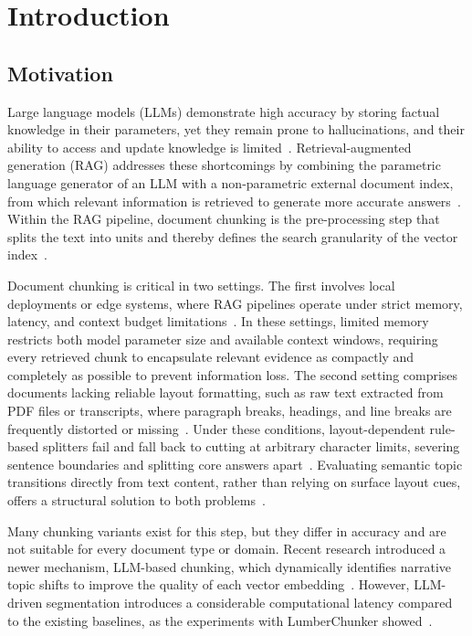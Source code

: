\chapter{Introduction}
\label{ch:intro}

\section{Motivation}

Large language models (LLMs) demonstrate high accuracy by storing factual knowledge in
their parameters, yet they remain prone to hallucinations, and their ability to access and
update knowledge is limited~\cite{lewis2020rag}. Retrieval-augmented generation (RAG)
addresses these shortcomings by combining the parametric language generator of an LLM with
a non-parametric external document index, from which relevant information is retrieved to
generate more accurate answers~\cite{lewis2020rag}. Within the RAG pipeline, document
chunking is the pre-processing step that splits the text into units and thereby defines the
search granularity of the vector index~\cite{smigielski2026chunking}.

Document chunking is critical in two settings. The first involves local deployments or edge
systems, where RAG pipelines operate under strict memory, latency, and context budget
limitations~\cite{smigielski2026chunking}. In these settings, limited memory restricts both
model parameter size and available context windows, requiring every retrieved chunk to
encapsulate relevant evidence as compactly and completely as possible to prevent
information loss. The second setting comprises documents lacking reliable layout
formatting, such as raw text extracted from PDF files or transcripts, where paragraph
breaks, headings, and line breaks are frequently distorted or
missing~\cite{duarte2024lumberchunker}. Under these conditions, layout-dependent
rule-based splitters fail and fall back to cutting at arbitrary character limits, severing
sentence boundaries and splitting core answers apart~\cite{smigielski2026chunking}.
Evaluating semantic topic transitions directly from text content, rather than relying on
surface layout cues, offers a structural solution to both
problems~\cite{duarte2024lumberchunker}.

Many chunking variants exist for this step, but they differ in accuracy and are not
suitable for every document type or domain. Recent research introduced a newer mechanism,
LLM-based chunking, which dynamically identifies narrative topic shifts to improve the
quality of each vector embedding~\cite{duarte2024lumberchunker}. However, LLM-driven
segmentation introduces a considerable computational latency compared to the existing
baselines, as the experiments with LumberChunker showed~\cite{duarte2024lumberchunker}.

